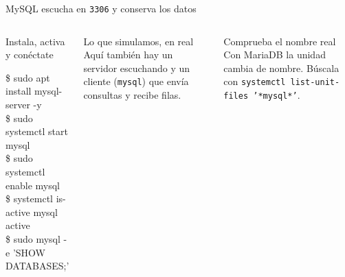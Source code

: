 \documentclass[aspectratio=169,10pt,c]{beamer}
\begin{document}
\begin{frame}{MySQL escucha en \texttt{3306} y conserva los datos}
\begin{columns}[T,onlytextwidth]
\begin{exampleblock}{Instala, activa y conéctate}
\begin{terminal}\footnotesize
\$ sudo apt install mysql-server -y\\
\$ sudo systemctl start mysql\\
\$ sudo systemctl enable mysql\\
\$ systemctl is-active mysql\\
active\\
\$ sudo mysql -e 'SHOW DATABASES;'
\end{terminal}
\end{exampleblock}
\begin{block}{Lo que simulamos, en real}
\small Aquí también hay un servidor escuchando y un cliente (\texttt{mysql}) que envía consultas y recibe filas.
\end{block}
\begin{block}{Comprueba el nombre real}
\small Con MariaDB la unidad cambia de nombre. Búscala con \texttt{systemctl list-unit-files '*mysql*'}.
\end{block}
\end{columns}
\end{frame}
\end{document}
